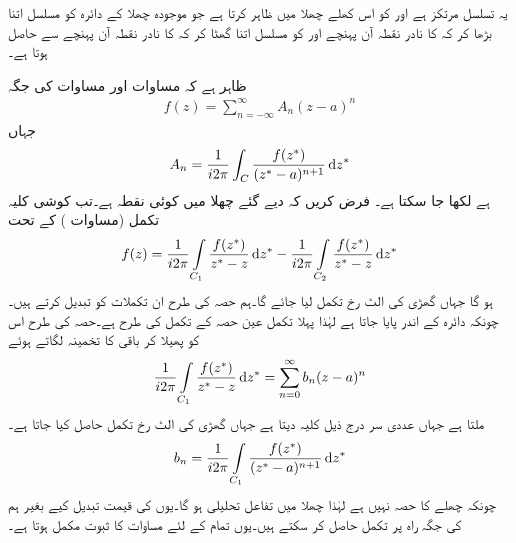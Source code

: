 یہ تسلسل مرتکز ہے اور  کو اس کھلے چھلا میں ظاہر کرتا ہے جو موجودہ چھلا کے دائرہ   کو مسلسل اتنا بڑھا کر کہ  کا نادر نقطہ آن پہنچے  اور  کو مسلسل اتنا گھٹا کر کہ  کا نادر نقطہ آن پہنچے سے حاصل ہوتا ہے۔

ظاہر ہے کہ مساوات  اور مساوات  کی جگہ
\begin{align}\label{مساوات_ٹیلر_لوغوں_تسلسل_الف_الف}
f(z)=\sum\limits_{n=-\infty}^{\infty} A_n(z-a)^n
\end{align}
جہاں
\begin{align}\label{مساوات_ٹیلر_لوغوں_تسلسل_ب_ب}
A_n=\frac{1}{i2\pi}\int_C \frac{f(z^*)}{(z^*-a)^{n+1}}\dif z^*
\end{align}
ہے لکھا جا سکتا ہے۔
\quad
فرض کریں کہ دیے گئے چھلا میں  کوئی نقطہ ہے۔تب کوشی کلیہ تکمل (مساوات ) کے تحت
\begin{align}\label{مساوات_ٹیلر_لوغوں_تسلسل_پ}
f(z)=\frac{1}{i2\pi}\int\limits_{C_1} \frac{f(z^*)}{z^*-z}\dif z^*-\frac{1}{i2\pi}\int\limits_{C_2}\frac{f(z^*)}{z^*-z}\dif z^*
\end{align}
ہو گا جہاں گھڑی کی الٹ رخ تکمل لیا جائے گا۔ہم حصہ  کی طرح ان تکملات کو تبدیل کرتے ہیں۔چونکہ  دائرہ  کے اندر پایا جاتا ہے لہٰذا پہلا تکمل عین حصہ  کے تکمل کی طرح ہے۔حصہ  کی طرح اس کو پھیلا کر باقی کا تخمینہ لگاتے ہوئے
\begin{align}
\frac{1}{i2\pi}\int\limits_{C_1}\frac{f(z^*)}{z^*-z}\dif z^*=\sum\limits_{n=0}^{\infty} b_n(z-a)^n
\end{align}
ملتا ہے جہاں عددی سر درج ذیل کلیہ دیتا ہے جہاں گھڑی کی الٹ رخ تکمل حاصل کیا جاتا ہے۔
\begin{align}
b_n=\frac{1}{i2\pi}\int\limits_{C_1} \frac{f(z^*)}{(z^*-a)^{n+1}}\dif z^*
\end{align}
چونکہ  چھلے کا حصہ نہیں ہے لہٰذا چھلا میں  تفاعل   تحلیلی ہو گا۔یوں  کی قیمت تبدیل کیے بغیر ہم  کی جگہ راہ  پر تکمل حاصل کر سکتے ہیں۔یوں تمام  کے لئے مساوات  کا ثبوت مکمل ہوتا ہے۔

